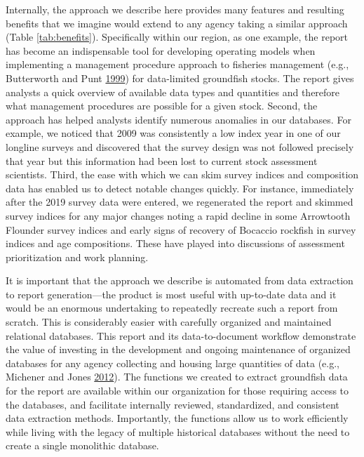 \documentclass[12pt,]{article}
\begin{document}
Internally, the approach we describe here provides many features and resulting benefits that we imagine would extend to any agency taking a similar approach (Table \ref{tab:benefits}).
Specifically within our region, as one example, the report has become an indispensable tool for developing operating models when implementing a management procedure approach to fisheries management (e.g., Butterworth and Punt \protect\hyperlink{ref-butterworth1999}{1999}) for data-limited groundfish stocks.
The report gives analysts a quick overview of available data types and quantities and therefore what management procedures are possible for a given stock.
Second, the approach has helped analysts identify numerous anomalies in our databases.
For example, we noticed that 2009 was consistently a low index year in one of our longline surveys and discovered that the survey design was not followed precisely that year but this information had been lost to current stock assessment scientists.
Third, the ease with which we can skim survey indices and composition data has enabled us to detect notable changes quickly.
For instance, immediately after the 2019 survey data were entered, we regenerated the report and skimmed survey indices for any major changes noting a rapid decline in some Arrowtooth Flounder survey indices and early signs of recovery of Bocaccio rockfish in survey indices and age compositions. These have played into discussions of assessment prioritization and work planning.

It is important that the approach we describe is automated from data extraction to report generation---the product is most useful with up-to-date data and it would be an enormous undertaking to repeatedly recreate such a report from scratch.
This is considerably easier with carefully organized and maintained relational databases. This report and its data-to-document workflow demonstrate the value of investing in the development and ongoing maintenance of organized databases for any agency collecting and housing large quantities of data (e.g., Michener and Jones \protect\hyperlink{ref-michener2012}{2012}). The functions we created to extract groundfish data for the report are available within our organization for those requiring access to the databases, and facilitate internally reviewed, standardized, and consistent data extraction methods.
Importantly, the functions allow us to work efficiently while living with the legacy of multiple historical databases without the need to create a single monolithic database.
\end{document}
